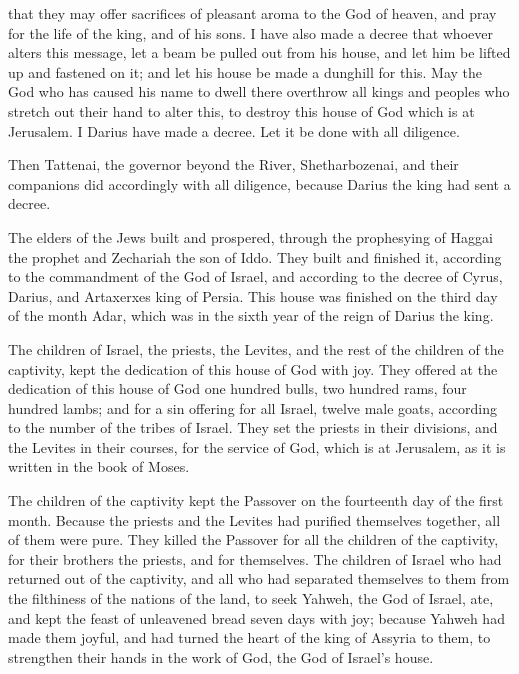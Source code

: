 {that they may offer sacrifices of pleasant aroma to the God of heaven, and pray for the life of the king, and of his sons.
I have also made a decree that whoever alters this message, let a beam be pulled out from his house, and let him be lifted up and fastened on it; and let his house be made a dunghill for this.
May the God who has caused his name to dwell there overthrow all kings and peoples who stretch out their hand to alter this, to destroy this house of God which is at Jerusalem. I Darius have made a decree. Let it be done with all diligence.
\par }{\BB \par }{\PP {}Then Tattenai, the governor beyond the River, Shetharbozenai, and their companions did accordingly with all diligence, because Darius the king had sent a decree.
\par }{\PP {}The elders of the Jews built and prospered, through the prophesying of Haggai the prophet and Zechariah the son of Iddo. They built and finished it, according to the commandment of the God of Israel, and according to the decree of Cyrus, Darius, and Artaxerxes king of Persia.
This house was finished on the third day of the month Adar, which was in the sixth year of the reign of Darius the king.
\par }{\PP {}The children of Israel, the priests, the Levites, and the rest of the children of the captivity, kept the dedication of this house of God with joy.
They offered at the dedication of this house of God one hundred bulls, two hundred rams, four hundred lambs; and for a sin offering for all Israel, twelve male goats, according to the number of the tribes of Israel.
They set the priests in their divisions, and the Levites in their courses, for the service of God, which is at Jerusalem, as it is written in the book of Moses.
\par }{\PP {}The children of the captivity kept the Passover on the fourteenth day of the first month.
Because the priests and the Levites had purified themselves together, all of them were pure. They killed the Passover for all the children of the captivity, for their brothers the priests, and for themselves.
The children of Israel who had returned out of the captivity, and all who had separated themselves to them from the filthiness of the nations of the land, to seek Yahweh, the God of Israel, ate,
and kept the feast of unleavened bread seven days with joy; because Yahweh had made them joyful, and had turned the heart of the king of Assyria to them, to strengthen their hands in the work of God, the God of Israel’s house.

}
